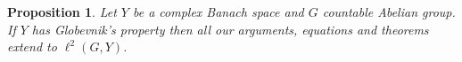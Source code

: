 \documentclass{article}
\newcommand\R{{\mathbb R}}
\newcommand\eps{{\varepsilon}}
\newcommand\Speps{{\rm Spec}_\eps}
\newtheorem{proposition}[theorem]{Proposition}
\numberwithin{equation}{section}   %
\numberwithin{figure}{section}  %
\begin{document}
\begin{proposition} \label{prop:Globevnik}
Let $Y$ be a complex Banach space and $G$ countable Abelian group.
If $Y$ has Globevnik's property then all our arguments, equations and theorems extend to $\ell^2(G,Y)$. 
% 
\end{proposition}


\end{document}
